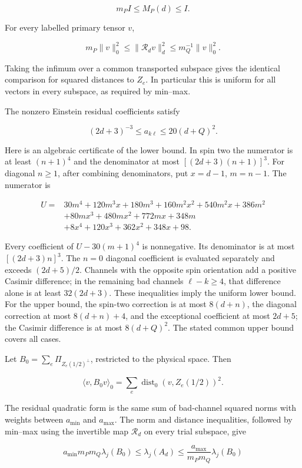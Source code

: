 \[
m_PI\leq M_P(d)\leq I.
\]

For every labelled primary tensor \(v\),

\[
m_P\|v\|_0^2\leq\|\mathcal R_dv\|_d^2
\leq m_Q^{-1}\|v\|_0^2.
\]

Taking the infimum over a common transported subspace gives the identical comparison for squared distances to \(Z_e\). In particular this is uniform for all vectors in every subspace, as required by min--max.

The nonzero Einstein residual coefficients satisfy

\[
(2d+3)^{-3}\leq a_{k\ell}\leq20(d+Q)^2.
\]

Here is an algebraic certificate of the lower bound. In spin two the numerator is at least \((n+1)^4\) and the denominator at most \([(2d+3)(n+1)]^3\). For diagonal \(n\geq1\), after combining denominators, put \(x=d-1\), \(m=n-1\). The numerator is

\[
\begin{aligned}
U={}&30m^4+120m^3x+180m^3+160m^2x^2+540m^2x+386m^2\\
&+80mx^3+480mx^2+772mx+348m\\
&+8x^4+120x^3+362x^2+348x+98.
\end{aligned}
\]

Every coefficient of \(U-30(m+1)^4\) is nonnegative. Its denominator is at most \([(2d+3)n]^3\). The \(n=0\) diagonal coefficient is evaluated separately and exceeds \((2d+5)/2\). Channels with the opposite spin orientation add a positive Casimir difference; in the remaining bad channels \(\ell-k\geq4\), that difference alone is at least \(32(2d+3)\). These inequalities imply the uniform lower bound. For the upper bound, the spin-two correction is at most \(8(d+n)\), the diagonal correction at most \(8(d+n)+4\), and the exceptional coefficient at most \(2d+5\); the Casimir difference is at most \(8(d+Q)^2\). The stated common upper bound covers all cases.

Let \(B_0=\sum_e\Pi_{Z_e(1/2)^\perp}\), restricted to the physical space. Then

\[
\langle v,B_0v\rangle_0=\sum_e\operatorname{dist}_0(v,Z_e(1/2))^2.
\]

The residual quadratic form is the same sum of bad-channel squared norms with weights between \(a_{\min}\) and \(a_{\max}\). The norm and distance inequalities, followed by min--max using the invertible map \(\mathcal R_d\) on every trial subspace, give

\[
a_{\min}m_Pm_Q\lambda_j(B_0)
\leq\lambda_j(A_d)
\leq\frac{a_{\max}}{m_Pm_Q}\lambda_j(B_0)
\]

